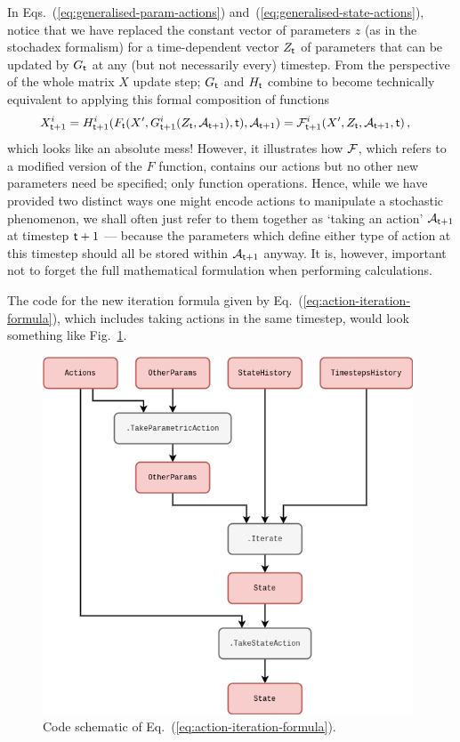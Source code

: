In Eqs.~(\ref{eq:generalised-param-actions}) and~(\ref{eq:generalised-state-actions}), notice that we have replaced the constant vector of parameters $z$ (as in the stochadex formalism) for a time-dependent vector $Z_{{\sf t}}$ of parameters that can be updated by $G_{\sf t}$ at any (but not necessarily every) timestep. From the perspective of the whole matrix $X$ update step; $G_{\sf t}$ and $H_{\sf t}$ combine to become technically equivalent to applying this formal composition of functions
\begin{align}
X^i_{{\sf t}+1} &= H^i_{{\sf t}+1}(F_{\sf t}(X', G_{{\sf t}+1}^i(Z_{{\sf t}}, {\cal A}_{{\sf t}+1}), {\sf t}), {\cal A}_{{\sf t}+1}) = {\cal F}^i_{{\sf t}+1}(X', Z_{{\sf t}}, {\cal A}_{{\sf t}+1}, {\sf t}) \label{eq:action-iteration-formula}\,,
\end{align}
which looks like an absolute mess! However, it illustrates how ${\cal F}$, which refers to a modified version of the $F$ function, contains our actions but no other new parameters need be specified; only function operations. Hence, while we have provided two distinct ways one might encode actions to manipulate a stochastic phenomenon, we shall often just refer to them together as `taking an action' ${\cal A}_{{\sf t}+1}$ at timestep ${\sf t}+1$ --- because the parameters which define either type of action at this timestep should all be stored within ${\cal A}_{{\sf t}+1}$ anyway. It is, however, important not to forget the full mathematical formulation when performing calculations. 

The code for the new iteration formula given by Eq.~(\ref{eq:action-iteration-formula}), which includes taking actions in the same timestep, would look something like Fig.~\ref{fig:iterations-with-actions}.

\begin{figure}[h]
\centering
\includegraphics[width=11cm]{images/chapter-9-iterations-with-actions.drawio.png}
\caption{Code schematic of Eq.~(\ref{eq:action-iteration-formula}).}
\label{fig:iterations-with-actions}
\end{figure}